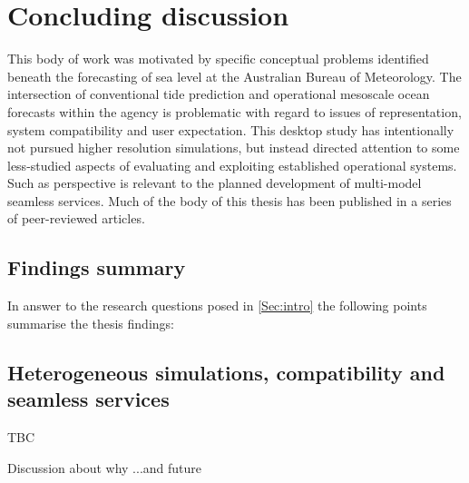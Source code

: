 
\chapter{Concluding discussion}\label{c:conclusions}

This body of work was motivated by specific conceptual problems identified beneath the forecasting of sea level at the Australian Bureau of Meteorology.  The intersection of conventional tide prediction and operational mesoscale ocean forecasts within the agency is problematic with regard to issues of representation, system compatibility and user expectation.
This desktop study has intentionally not pursued higher resolution simulations, but instead directed attention to some less-studied aspects of evaluating and exploiting established operational systems.   Such as perspective is relevant to the planned development of multi-model seamless services.   
Much of the body of this thesis has been published in a series of peer-reviewed articles.
\section{Findings summary}
In answer to the research questions posed in \ref{Sec:intro} the following points summarise the thesis findings:


\section{Heterogeneous simulations, compatibility and seamless services}

TBC

Discussion about why ...and future 



